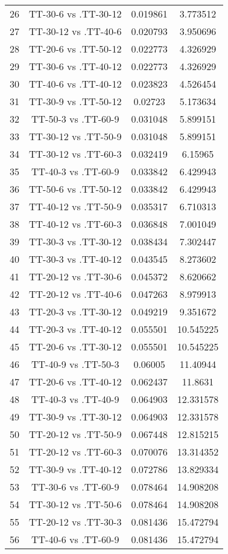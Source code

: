 \documentclass[a4paper,10pt]{article}
\begin{document}
\begin{landscape}
\begin{table}[!htp]
\begin{tabular}{cccc}
26&TT-30-6 vs .TT-30-12&0.019861&3.773512\\
27&TT-30-12 vs .TT-40-6&0.020793&3.950696\\
28&TT-20-6 vs .TT-50-12&0.022773&4.326929\\
29&TT-30-6 vs .TT-40-12&0.022773&4.326929\\
30&TT-40-6 vs .TT-40-12&0.023823&4.526454\\
31&TT-30-9 vs .TT-50-12&0.02723&5.173634\\
32&TT-50-3 vs .TT-60-9&0.031048&5.899151\\
33&TT-30-12 vs .TT-50-9&0.031048&5.899151\\
34&TT-30-12 vs .TT-60-3&0.032419&6.15965\\
35&TT-40-3 vs .TT-60-9&0.033842&6.429943\\
36&TT-50-6 vs .TT-50-12&0.033842&6.429943\\
37&TT-40-12 vs .TT-50-9&0.035317&6.710313\\
38&TT-40-12 vs .TT-60-3&0.036848&7.001049\\
39&TT-30-3 vs .TT-30-12&0.038434&7.302447\\
40&TT-30-3 vs .TT-40-12&0.043545&8.273602\\
41&TT-20-12 vs .TT-30-6&0.045372&8.620662\\
42&TT-20-12 vs .TT-40-6&0.047263&8.979913\\
43&TT-20-3 vs .TT-30-12&0.049219&9.351672\\
44&TT-20-3 vs .TT-40-12&0.055501&10.545225\\
45&TT-20-6 vs .TT-30-12&0.055501&10.545225\\
46&TT-40-9 vs .TT-50-3&0.06005&11.40944\\
47&TT-20-6 vs .TT-40-12&0.062437&11.8631\\
48&TT-40-3 vs .TT-40-9&0.064903&12.331578\\
49&TT-30-9 vs .TT-30-12&0.064903&12.331578\\
50&TT-20-12 vs .TT-50-9&0.067448&12.815215\\
51&TT-20-12 vs .TT-60-3&0.070076&13.314352\\
52&TT-30-9 vs .TT-40-12&0.072786&13.829334\\
53&TT-30-6 vs .TT-60-9&0.078464&14.908208\\
54&TT-30-12 vs .TT-50-6&0.078464&14.908208\\
55&TT-20-12 vs .TT-30-3&0.081436&15.472794\\
56&TT-40-6 vs .TT-60-9&0.081436&15.472794\\

\end{tabular}
\end{table}
\end{landscape}
\end{document}
